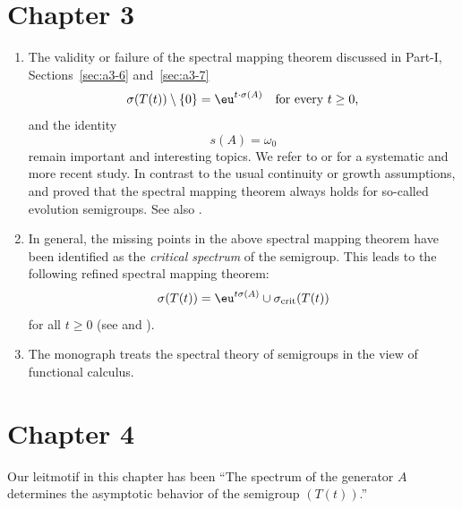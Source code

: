 \section*{Chapter 3}
\begin{enumerate} 

\item
The validity or failure of the spectral mapping theorem discussed in Part-I, Sections~\ref{sec:a3-6} and~\ref{sec:a3-7} 
\[
\sigma(T(t)) \setminus \{0\} = \eu^{t \cdot \sigma(A)} \quad \text{for every $t \geq 0$,}
\]
and the identity 
\[
s(A) = \omega_{0}
\]
remain important and interesting topics.
We refer to \textcite[Section 2]{zbmath00921898} or \textcite[Chapter IV]{zbmath01354832} for a systematic and more recent study. 
In contrast to the usual continuity or growth assumptions, 
\textcite[]{zbmath00763985} and \textcite[]{zbmath00858476}
proved that the spectral mapping theorem always holds for so-called evolution semigroups.
See also \textcite[Chapter VI, Theorem 9.18]{zbmath01354832}.

\item 
In general, the missing points in the above spectral mapping theorem have been 
identified as the \emph{critical spectrum} of the semigroup. 
This leads to the 
following refined spectral mapping theorem:
\[
    \sigma(T(t)) = 
        \eu^{t \sigma(A)} \cup \sigma_{\text{crit}}(T(t)) 
\]
for all $t \geq 0$ (see \textcite{zbmath01496433} and \textcite{zbmath01484683}).

\item
The monograph \textcite{zbmath05030449} treats the spectral theory of semigroups in the view of functional calculus.

\end{enumerate}
\section*{Chapter 4}
Our leitmotif in this chapter has been
\enquote{The spectrum of the generator $A$ determines the asymptotic behavior of the semigroup $(T(t))$.}

